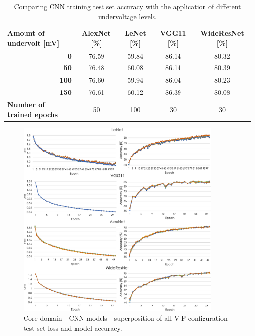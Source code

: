 \begin{table}[htb]
    \centering
   
    \label{tab:trainingAcc}
    \begin{tabular}{rcccc}
        \multicolumn{1}{l}{{\textbf{Amount of undervolt {[}mV{]}}}} &
          \textbf{AlexNet {[}\%{]}} &
          \textbf{LeNet {[}\%{]}} &
          \textbf{VGG11 {[}\%{]}} &
          \textbf{WideResNet {[}\%{]}} \\ \hline
        \textbf{0}   & 76.59 & 59.84 & 86.14 & 80.32 \\
        \textbf{50}  & 76.48 & 60.08 & 86.14 & 80.39 \\
        \textbf{100} & 76.60 & 59.94 & 86.04 & 80.23 \\
        \textbf{150} & 76.61 & 60.12 & 86.39 & 80.08 \\ \hline
        \multicolumn{1}{l}{{\textbf{Number of trained epochs}}} &
          50 &
          100 &
          30 &
          30
    \end{tabular}%
     \caption{Comparing CNN training test set accuracy with the application of different undervoltage levels.}
\end{table}

\begin{figure}[htb]
    \centering
        \includegraphics[width=0.9\textwidth]{Figures/Application To Deep Learning/CNN_loss_acc.pdf}
        \caption{Core domain - CNN models - superposition of all V-F configuration test set loss and model accuracy.}
    \label{fig:CNN_loss}
\end{figure}

